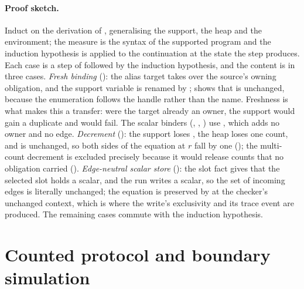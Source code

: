\documentclass[a4paper,UKenglish,cleveref]{lipics-v2021}
\begin{document}
\paragraph*{Proof sketch.}
Induct on the derivation of , generalising the support, the
heap and the environment; the measure is the syntax of the supported program and
the induction hypothesis is applied to the continuation at the state the step
produces. Each case is a step of  followed by the induction hypothesis,
and the content is in three cases.
\emph{Fresh binding} (): the alias target
takes over the source's owning obligation, and the support variable is renamed by
;  shows that  is
unchanged, because the enumeration follows the handle rather than the name. Freshness
is what makes this a transfer: were the target already an owner, the support would
gain a duplicate and  would fail. The scalar binders
(, , ) use
, which adds no owner and no edge.
\emph{Decrement} (): the support loses , the heap loses one
count, and  is unchanged, so both sides of the equation at
$r$ fall by one (); the multi-count decrement is excluded
precisely because it would release counts that no obligation carried
(). \emph{Edge-neutral scalar store} (): the
slot fact gives that the selected slot holds a scalar, and the run writes a
scalar, so the set of incoming edges is literally unchanged; the equation is
preserved by  at the checker's unchanged context,
which is where the write's exclusivity and its trace event are produced. The
remaining cases commute with the induction hypothesis.

\section{Counted protocol and boundary simulation}\label{sec:protocol}
\end{document}
